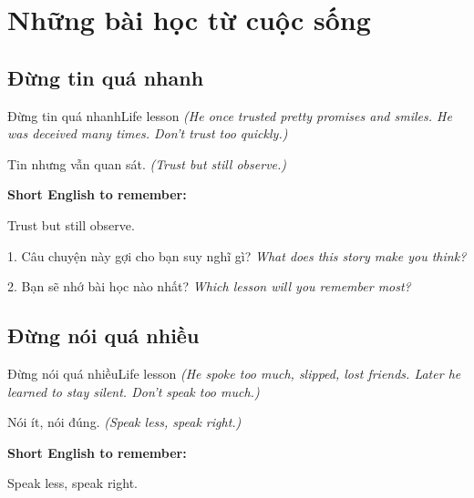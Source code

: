 \chapter{Những bài học từ cuộc sống}


\section{Đừng tin quá nhanh}
\begin{truyen}{Đừng tin quá nhanh}{Life lesson}
\textit{(He once trusted pretty promises and smiles. He was deceived many times. Don't trust too quickly.)}
\end{truyen}

\begin{baihoc}
Tin nhưng vẫn quan sát.
\textit{(Trust but still observe.)}
\end{baihoc}

\begin{ghinhoanh}
\textbf{Short English to remember:}

Trust but still observe.

\end{ghinhoanh}

\begin{tuhocnhanh}
1. Câu chuyện này gợi cho bạn suy nghĩ gì? \textit{What does this story make you think?}

2. Bạn sẽ nhớ bài học nào nhất? \textit{Which lesson will you remember most?}
\end{tuhocnhanh}
\ngancach


\section{Đừng nói quá nhiều}
\begin{truyen}{Đừng nói quá nhiều}{Life lesson}
\textit{(He spoke too much, slipped, lost friends. Later he learned to stay silent. Don't speak too much.)}
\end{truyen}

\begin{baihoc}
Nói ít, nói đúng.
\textit{(Speak less, speak right.)}
\end{baihoc}

\begin{ghinhoanh}
\textbf{Short English to remember:}

Speak less, speak right.

\end{ghinhoanh}

